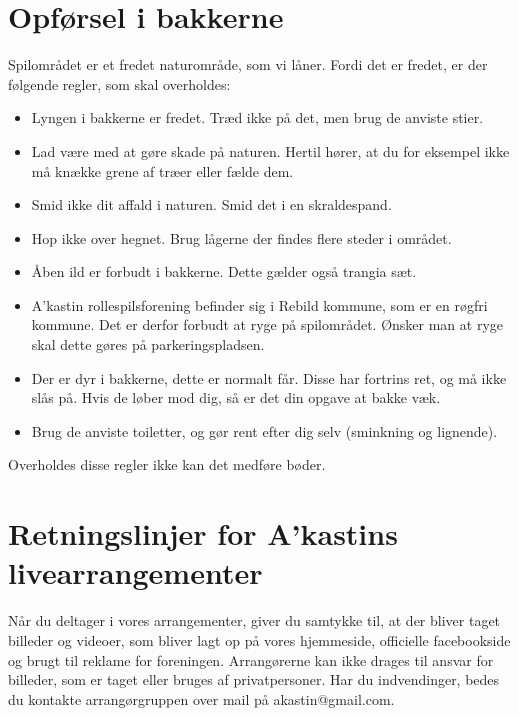 \section{Opførsel i bakkerne}
Spilområdet er et fredet naturområde, som vi låner. Fordi det er fredet, er der følgende regler, som skal overholdes:
\begin{itemize}
    \item Lyngen i bakkerne er fredet. Træd ikke på det, men brug de anviste stier.
    \item Lad være med at gøre skade på naturen. Hertil hører, at du for eksempel ikke må knække grene af træer eller fælde dem.
    \item Smid ikke dit affald i naturen. Smid det i en skraldespand.
    \item Hop ikke over hegnet. Brug lågerne der findes flere steder i området.
    \item Åben ild er forbudt i bakkerne. Dette gælder også trangia sæt.
    \item A’kastin rollespilsforening befinder sig i Rebild kommune, som er en røgfri kommune. Det er derfor forbudt at ryge på spilområdet. Ønsker man at ryge skal dette gøres på parkeringspladsen.
    \item Der er dyr i bakkerne, dette er normalt får. Disse har fortrins ret, og må ikke slås på. Hvis de løber mod dig, så er det din opgave at bakke væk.
    \item Brug de anviste toiletter, og gør rent efter dig selv (sminkning og lignende).
\end{itemize}
Overholdes disse regler ikke kan det medføre bøder.

\section{Retningslinjer for A’kastins livearrangementer}
Når du deltager i vores arrangementer, giver du samtykke til, at der bliver taget billeder og videoer, som bliver lagt op på vores hjemmeside, officielle facebookside og brugt til reklame for foreningen. Arrangørerne kan ikke drages til ansvar for billeder, som er taget eller bruges af privatpersoner. Har du indvendinger, bedes du kontakte arrangørgruppen over mail på akastin@gmail.com.